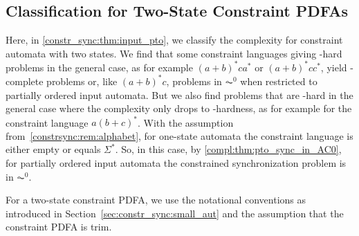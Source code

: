 \subsection{Classification for Two-State Constraint PDFAs}
\label{constrinput:sec:two-state-pto}

Here, in \cref{constr_sync:thm:input_pto}, we classify the complexity for constraint automata
with two states. We find that some constraint languages
giving \PSPACE-hard problems in the general case, as for example
$
(a+b)^*c a^*$ or  
$(a+b)^*cc^*$,
yield \LOGSPACE-complete problems or, like $(a+b)^*c$,
problems in $\AC^0$ when restricted to partially ordered input automata.
But we also find problems that are \PSPACE-hard in the general
case where the complexity only drops to \NP-hardness,
as for example for the constraint language $a(b+c)^*$.
With the assumption from~\cref{constrsync:rem:alphabet}, for one-state automata
the constraint language is either empty or equals $\Sigma^*$.
So, in this case, by \cref{compl:thm:pto_sync_in_AC0}, 
for partially ordered input automata the constrained synchronization
problem is in $\AC^0$.

For a two-state constraint PDFA, we use the notational conventions
as introduced in Section~\ref{sec:constr_sync:small_aut} and the assumption
that the constraint PDFA is trim.


